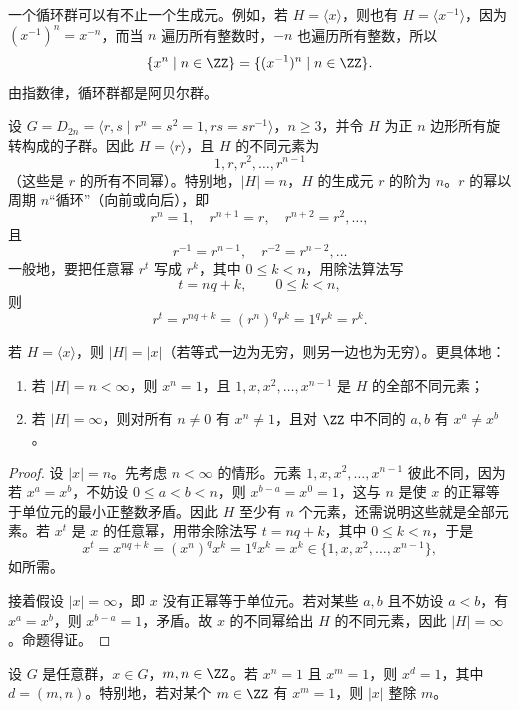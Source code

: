一个循环群可以有不止一个生成元。例如，若 $H=\langle x\rangle$，则也有 $H=\langle x^{-1}\rangle$，因为 $(x^{-1})^n=x^{-n}$，而当 $n$ 遍历所有整数时，$-n$ 也遍历所有整数，所以
\[
\{x^n\mid n\in\ZZ\}=\{(x^{-1})^n\mid n\in\ZZ\}.
\]
由指数律，循环群都是阿贝尔群。
\begin{example}
	设 $G=D_{2n}=\langle r,s\mid r^n=s^2=1,
	rs=sr^{-1}\rangle$，$n\geq 3$，并令 $H$ 为正 $n$ 边形所有旋转构成的子群。因此 $H=\langle r\rangle$，且 $H$ 的不同元素为
	\[
	1,r,r^2,\ldots,r^{n-1}
	\]
	（这些是 $r$ 的所有不同幂）。特别地，$|H|=n$，$H$ 的生成元 $r$ 的阶为 $n$。$r$ 的幂以周期 $n$“循环”（向前或向后），即
	\[
	r^n=1,
	\quad r^{n+1}=r,
	\quad r^{n+2}=r^2,\ldots,
	\]
	且
	\[
	r^{-1}=r^{n-1},\quad r^{-2}=r^{n-2},\ldots
	\]
	一般地，要把任意幂 $r^t$ 写成 $r^k$，其中 $0\leq k<n$，用除法算法写
	\[
	t=nq+k,
	\qquad 0\leq k<n,
	\]
	则
	\[
	r^t=r^{nq+k}=(r^n)^q r^k=1^q r^k=r^k.
	\]
\end{example}
\begin{proposition}\label{循环群的阶数}
	若 $H=\langle x\rangle$，则 $|H|=|x|$（若等式一边为无穷，则另一边也为无穷）。更具体地：
	\begin{enumerate}[label=(\arabic*)]
		\item 若 $|H|=n<\infty$，则 $x^n=1$，且 $1,x,x^2,\ldots,x^{n-1}$ 是 $H$ 的全部不同元素；
		\item 若 $|H|=\infty$，则对所有 $n\neq 0$ 有 $x^n\neq 1$，且对 $\ZZ$ 中不同的 $a,b$ 有 $x^a\neq x^b$。
	\end{enumerate}
	
\end{proposition}
\begin{proof}
	设 $|x|=n$。先考虑 $n<\infty$ 的情形。元素 $1,x,x^2,\ldots,x^{n-1}$ 彼此不同，因为若 $x^a=x^b$，不妨设 $0\leq a<b<n$，则 $x^{b-a}=x^0=1$，这与 $n$ 是使 $x$ 的正幂等于单位元的最小正整数矛盾。因此 $H$ 至少有 $n$ 个元素，还需说明这些就是全部元素。若 $x^t$ 是 $x$ 的任意幂，用带余除法写 $t=nq+k$，其中 $0\leq k<n$，于是
	\[
	x^t=x^{nq+k}=(x^n)^qx^k=1^qx^k=x^k\in\{1,x,x^2,\ldots,x^{n-1}\},
	\]
	如所需。
	
	接着假设 $|x|=\infty$，即 $x$ 没有正幂等于单位元。若对某些 $a,b$ 且不妨设 $a<b$，有 $x^a=x^b$，则 $x^{b-a}=1$，矛盾。故 $x$ 的不同幂给出 $H$ 的不同元素，因此 $|H|=\infty$。命题得证。
\end{proof}
\begin{proposition}\label{零化整除性}
	设 $G$ 是任意群，$x\in G$，$m,n\in\ZZ$。若 $x^n=1$ 且 $x^m=1$，则 $x^d=1$，其中 $d=(m,n)$。特别地，若对某个 $m\in\ZZ$ 有 $x^m=1$，则 $|x|$ 整除 $m$。
\end{proposition}

